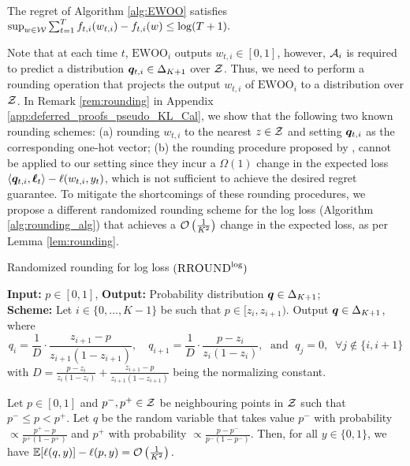 \begin{lemma}\label{lem:EWOO_regret_bound}
    The regret of Algorithm \ref{alg:EWOO} satisfies $
        \sup_{w \in \mathcal{W}} \sum_{t = 1} ^ {T} f_{t, i}(w_{t, i}) - f_{t, i}(w) \le \log (T + 1).$
\end{lemma}

Note that at each time $t$, $\text{EWOO}_{i}$ outputs $w_{t, i} \in [0, 1]$, however, $\mathcal{A}_{i}$ is required to predict a distribution ${\bm{q}}_{t, i} \in \Delta_{K + 1}$ over $\mathcal{Z}$. Thus, we need to perform a rounding operation that projects the output $w_{t, i}$ of $\text{EWOO}_{i}$ to a distribution over $\mathcal{Z}$. In Remark \ref{rem:rounding} in Appendix \ref{app:deferred_proofs_pseudo_KL_Cal},
we show that the following two known rounding schemes: (a) rounding $w_{t, i}$ to the nearest $z \in \mathcal{Z}$ and setting ${\bm{q}}_{t, i}$ as the corresponding one-hot vector; (b) the rounding procedure proposed by \cite{fishelsonfull}, cannot be applied to our setting since they incur a $\Omega(1)$ change in the expected loss $\left\langle {\ensuremath{\bm{q}}}_{t, i}, \bm{\ell}_{t} \right\rangle - \ell(w_{t, i}, y_{t})$, which is not sufficient to achieve the desired regret guarantee.
To mitigate the shortcomings of these rounding procedures, we propose a different randomized rounding scheme for the log loss (Algorithm \ref{alg:rounding_alg}) that achieves a $\mathcal{O}\left( \frac{1}{K^{2}} \right)$ change in the expected loss, as per  Lemma \ref{lem:rounding}. 
\begin{algorithm}[t]
                    \caption{Randomized rounding for log loss $(\textsc{RROUND}^{\text{log}})$}
                    \textbf{Input:} $p \in [0, 1]$, \textbf{Output:} Probability distribution ${\bm{q}} \in \Delta_{K + 1}$; \\ \label{alg:rounding_alg}
                    \textbf{Scheme:} Let $i \in \{0, \dots, K - 1\}$ be such that $p \in [z_{i}, z_{i + 1})$. Output ${\bm{q}} \in \Delta_{K + 1}$, where 
                    \[
                    q_i = \frac{1}{D} \cdot \frac{z_{i + 1} - p}{z_{i + 1}(1 - z_{i + 1})}, \quad
                    q_{i+1} = \frac{1}{D} \cdot \frac{p - z_{i}}{z_{i}(1 - z_{i})},
                    \;\text{ and }\;
                    q_j = 0, \;\;\forall j \notin \{i, i+1\}
                    \]
                with $D = \frac{p - z_{i}}{z_{i}(1 - z_{i})} + \frac{z_{i + 1} - p}{z_{i + 1}(1 - z_{i + 1})}$ being the normalizing constant.
\end{algorithm}	
\begin{lemma}\label{lem:rounding}
    Let $p \in [0, 1]$ and $p^{-}, p^{+} \in \mathcal{Z}$ be neighbouring points in $\mathcal{Z}$ such that $p^{-} \le p < p^{+}$. Let $q$ be the random variable that takes value $p^{-}$ with probability $\propto \frac{p^{+} - p}{p^{+}(1 - p^{+})}$ and $p^{+}$ with probability $\propto \frac{p - p^{-}}{p^{-}(1 - p^{-})}$. Then, for all $y \in \{0, 1\}$, we have $\mathbb{E}[\ell(q, y)] - \ell(p, y) = \mathcal{O}\left( \frac{1}{K^{2}} \right).$ 
\end{lemma}

